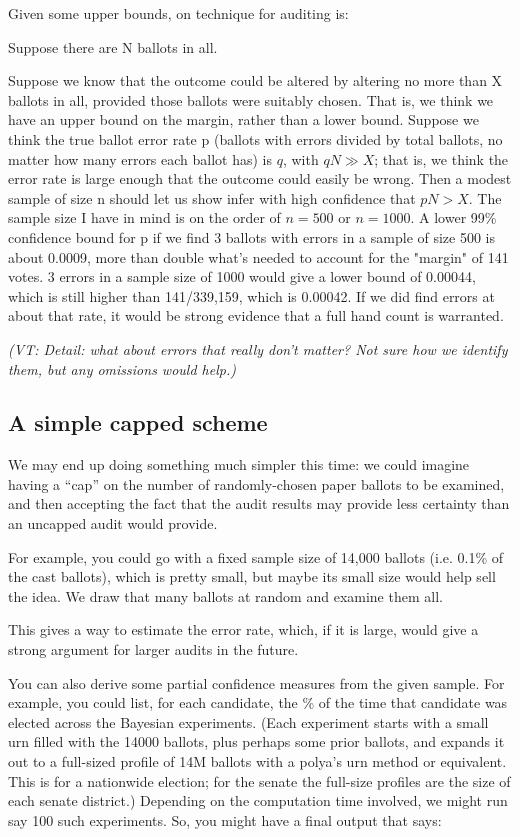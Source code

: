\documentclass[10pt,a4paper]{article}
\newcommand{\VTNote}[1]{{\it(VT: #1)}}
\begin{document}
Given some upper bounds, on technique for auditing is:

Suppose there are N ballots in all.

Suppose we know that the outcome could be altered by altering no more than X ballots in all, provided those ballots were suitably chosen. That is, we think we have an upper bound on the margin, rather than a lower bound. Suppose
we think the true ballot error rate p (ballots with errors divided by total ballots, no matter how many errors each ballot has) is $q$, with $qN \gg X$; that is, we think the error rate is large enough that the outcome could easily be wrong.  Then a modest sample
of size n should let us show infer with high confidence that $pN > X$. The sample size I have in mind is on the order of $n=500$ or $n=1000$. A lower 99\% confidence bound for p if we find 3 ballots with errors in a sample of size 500 is about 0.0009, more than double
what's needed to account for the "margin" of 141 votes. 3 errors in a sample size of 1000 would give a lower bound of 0.00044, which is still higher than
141/339,159, which is 0.00042.  If we did find errors at about that rate, it would be strong evidence that a full hand count is warranted.

\VTNote{Detail: what about errors that really don't matter?  Not sure how we identify them, but any omissions would help.}

\subsection{A simple capped scheme}
We may end up doing something much simpler this time: we
could imagine having a ``cap'' on the number of randomly-chosen 
paper ballots to be examined, and then accepting the fact that
the audit results may provide less certainty than an uncapped
audit would provide.

For example, you could go with a fixed sample size of 14,000
ballots (i.e. 0.1\% of the cast ballots), which is pretty small, but
maybe its small size would help sell the idea.  We draw that
many ballots at random and examine them all.

This gives a way to estimate the error rate, which, if it is large, would give a strong argument for larger audits in the
future.

You can also derive some partial confidence measures from the
given sample.  For example, you could list, for each candidate,
the \% of the time that candidate was elected across the Bayesian
experiments.  (Each experiment starts with a small urn filled with
the 14000 ballots, plus perhaps some prior ballots, and expands
it out to a full-sized profile of 14M ballots with a polya's urn
method or equivalent.  This is for a nationwide election; for the
senate the full-size profiles are the size of each senate district.)
Depending on the computation time involved, we might run say
100 such experiments.  So, you might have a final output that says:
\end{document}
